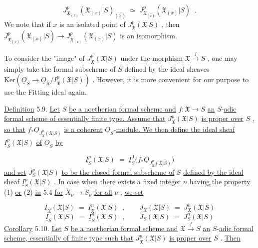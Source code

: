 \begin{equation*}
J^{p}_{\mathfrak{X}_{(x)}}(\mathfrak{X}_{(x)}|S)_{(\hat{x})} \;\simeq\; J^{p}_{\mathfrak{X}_{(\hat{x})}}(\mathfrak{X}_{(\hat{x})}|S) \;\;.
\end{equation*}
We note that if $x$ is an isolated point of $J^{p}_{\mathfrak{X}}(\mathfrak{X}|S)$ , then $J^{p}_{\mathfrak{X}_{(\hat{x})}}(\mathfrak{X}_{(\hat{x})}|S) \to J^{p}_{\mathfrak{X}_{(x)}}(\mathfrak{X}_{(x)}|S)$ is an isomorphism.

To consider the "image" of $J^{p}_{\mathfrak{X}}(\mathfrak{X}|S)$ under the morphism $\mathfrak{X} \xrightarrow{\,f\,} S$ , one may simply take the formal subscheme of $S$ defined by the ideal sheaves $\mathrm{Ker}(\underline{O}_S \to \underline{O}_{\mathfrak{X}}/I^{p}_{\mathfrak{X}}(\mathfrak{X}|S))$ . However, it is more convenient for our purpose to use the Fitting ideal again.

\underline{Definition} 5.9. \underline{Let} $S$ \underline{be a noetherian formal scheme and} $f : \mathfrak{X} \to S$ \underline{an} $S$-\underline{adic formal scheme of essentially finite type. Assume that} $J^{p}_{\mathfrak{X}}(\mathfrak{X}|S)$ \underline{is proper over} $S$ , \underline{so that} $f_{*}\underline{O}_{J^{p}_{\mathfrak{X}}(\mathfrak{X}|S)}$ \underline{is a coherent} $\underline{O}_S$-\underline{module. We then define the ideal sheaf} $\underline{I}^{p}_{S}(\mathfrak{X}|S)$ \underline{of} $\underline{O}_S$ \underline{by}

\begin{equation*}
\underline{I}^{p}_{S}(\mathfrak{X}|S) \;=\; \underline{I}^{0}_{S}\big(f_{*}\underline{O}_{J^{p}_{\mathfrak{X}}(\mathfrak{X}|S)}\big)
\end{equation*}
\underline{and set} $J^{p}_{S}(\mathfrak{X}|S)$ \underline{to be the closed formal subscheme of} $S$ \underline{defined by the ideal sheaf} $\underline{I}^{p}_{S}(\mathfrak{X}|S)$ . \underline{In case when there exists a fixed integer} $n$ \underline{having the property} (1) \underline{or} (2) \underline{in} 5.4 \underline{for} $X_\nu \to S_\nu$ \underline{for all} $\nu$ , \underline{we set}

\begin{equation*}
\underline{I}_{\mathfrak{X}}(\mathfrak{X}|S) \;=\; \underline{I}^{n}_{\mathfrak{X}}(\mathfrak{X}|S) \;\;,\qquad J_{\mathfrak{X}}(\mathfrak{X}|S) \;=\; J^{n}_{\mathfrak{X}}(\mathfrak{X}|S)
\end{equation*}
\begin{equation*}
\underline{I}_{S}(\mathfrak{X}|S) \;=\; \underline{I}^{n}_{S}(\mathfrak{X}|S) \;\;,\qquad J_{S}(\mathfrak{X}|S) \;=\; J^{n}_{S}(\mathfrak{X}|S)
\end{equation*}
\underline{Corollary} 5.10. \underline{Let} $S$ \underline{be a noetherian formal scheme and} $\mathfrak{X} \xrightarrow{\,f\,} S$ \underline{an} $S$-\underline{adic formal scheme, essentially of finite type such that} $J^{p}_{\mathfrak{X}}(\mathfrak{X}|S)$ \underline{is proper over} $S$ . \underline{Then}

